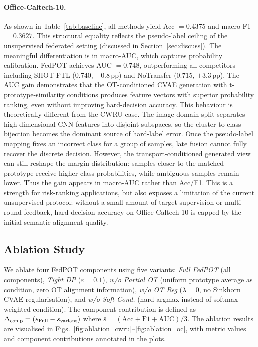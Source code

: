 \documentclass[a4paper,fleqn]{cas-sc}
\begin{document}
\paragraph{Office-Caltech-10.}
As shown in Table~\ref{tab:baseline}, all methods yield
Acc $=0.4375$ and macro-F1 $=0.3627$.
This structural equality reflects the pseudo-label ceiling of the
unsupervised federated setting (discussed in Section~\ref{sec:discuss}).
The meaningful differentiation is in macro-AUC, which captures
probability calibration.
FedPOT achieves AUC $=0.748$, outperforming all competitors including
SHOT-FTL ($0.740$, $+$0.8\,pp) and NoTransfer ($0.715$, $+$3.3\,pp).
The AUC gain demonstrates that the OT-conditioned CVAE generation with
t-prototype-similarity conditions produces feature vectors with superior
probability ranking, even without improving hard-decision accuracy.
This behaviour is theoretically different from the CWRU case. The
image-domain split separates high-dimensional CNN features into disjoint
subspaces, so the cluster-to-class bijection becomes the dominant source of
hard-label error. Once the pseudo-label mapping fixes an incorrect class
for a group of samples, late fusion cannot fully recover the discrete
decision. However, the transport-conditioned generated view can still
reshape the margin distribution: samples closer to the matched prototype
receive higher class probabilities, while ambiguous samples remain lower.
Thus the gain appears in macro-AUC rather than Acc/F1. This is a strength
for risk-ranking applications, but also exposes a limitation of the current
unsupervised protocol: without a small amount of target supervision or
multi-round feedback, hard-decision accuracy on Office-Caltech-10 is capped
by the initial semantic alignment quality.
\FloatBarrier

\subsection{Ablation Study}
\label{sec:ablation}

We ablate four FedPOT components using five variants:
\emph{Full FedPOT} (all components),
\emph{Tight DP} ($\varepsilon=0.1$),
\emph{w/o Partial OT} (uniform prototype average as condition,
zero OT alignment information),
\emph{w/o OT Reg} ($\lambda=0$, no Sinkhorn CVAE regularisation),
and \emph{w/o Soft Cond.} (hard argmax instead of softmax-weighted
condition).
The component contribution is defined as
$\Delta_{\rm comp} =
(\bar{s}_{\rm Full} - \bar{s}_{\rm variant})$ where
$\bar{s} = (\text{Acc}+\text{F1}+\text{AUC})/3$.
The ablation results are visualised in
Figs.~\ref{fig:ablation_cwru}--\ref{fig:ablation_oc}, with metric values
and component contributions annotated in the plots.
\end{document}
